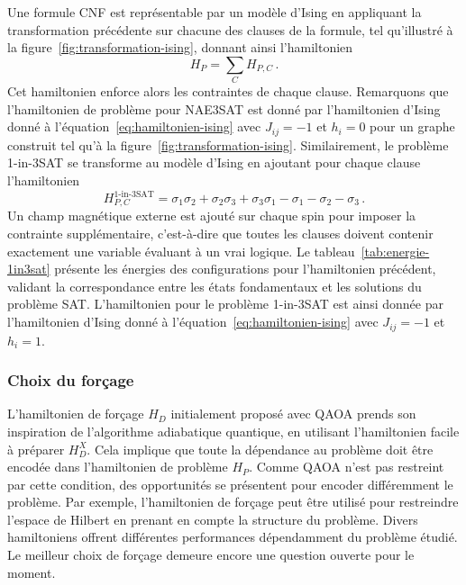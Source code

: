 Une formule CNF est représentable par un modèle d'Ising en appliquant la transformation précédente sur chacune des clauses de la formule, tel qu'illustré à la figure~\ref{fig:transformation-ising}, donnant ainsi l'hamiltonien 
\begin{equation}
    H_{P} = \sum_{C} H_{P, C} \,.
\end{equation}
Cet hamiltonien enforce alors les contraintes de chaque clause. Remarquons que l'hamiltonien de problème pour NAE3SAT est donné par l'hamiltonien d'Ising donné à l'équation~\ref{eq:hamiltonien-ising} avec $J_{ij}=-1$ et $h_{i}=0$ pour un graphe construit tel qu'à la figure~\ref{fig:transformation-ising}. Similairement, le problème 1-in-3SAT se transforme au modèle d'Ising en ajoutant pour chaque clause l'hamiltonien
\begin{equation}
   H_{P, C}^{\text{1-in-3SAT}} = \sigma_{1}\sigma_{2} + \sigma_{2}\sigma_{3} + \sigma_{3}\sigma_{1} - \sigma_{1} - \sigma_{2} - \sigma_{3} \,.
\end{equation}
Un champ magnétique externe est ajouté sur chaque spin pour imposer la contrainte supplémentaire, c'est-à-dire que toutes les clauses doivent contenir exactement une variable évaluant à un vrai logique. Le tableau~\ref{tab:energie-1in3sat} présente les énergies des configurations pour l'hamiltonien précédent, validant la correspondance entre les états fondamentaux et les solutions du problème SAT. L'hamiltonien pour le problème 1-in-3SAT est ainsi donnée par l'hamiltonien d'Ising donné à l'équation~\ref{eq:hamiltonien-ising} avec $J_{ij}=-1$ et $h_{i}=1$.


\subsubsection{Choix du forçage}

L'hamiltonien de forçage $H_{D}$ initialement proposé avec QAOA prends son inspiration de l'algorithme adiabatique quantique, en utilisant l'hamiltonien facile à préparer $H_{D}^{X}$. Cela implique que toute la dépendance au problème doit être encodée dans l'hamiltonien de problème $H_{P}$. Comme QAOA n'est pas restreint par cette condition, des opportunités se présentent pour encoder différemment le problème. Par exemple, l'hamiltonien de forçage peut être utilisé pour restreindre l'espace de Hilbert en prenant en compte la structure du problème. Divers hamiltoniens offrent différentes performances dépendamment du problème étudié. Le meilleur choix de forçage demeure encore une question ouverte pour le moment. 

